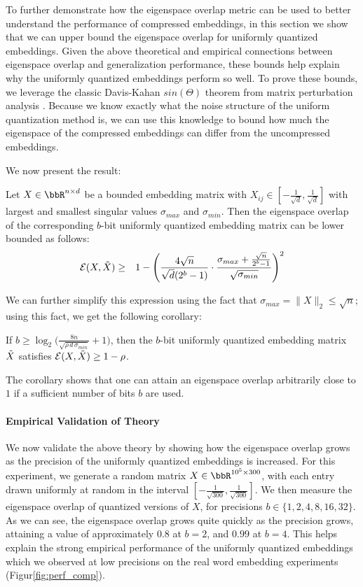 To further demonstrate how the eigenspace overlap metric can be used to better understand the performance of compressed embeddings, in this section we show that we can upper bound the eigenspace overlap for uniformly quantized embeddings.
Given the above theoretical and empirical connections between eigenspace overlap and generalization performance, these bounds help explain why the uniformly quantized embeddings perform so well.
To prove these bounds, we leverage the classic Davis-Kahan $sin(\Theta)$ theorem from matrix perturbation analysis \citep{sintheta70}.
Because we know exactly what the noise structure of the uniform quantization method is, we can use this knowledge to bound how much the eigenspace of the compressed embeddings can differ from the uncompressed embeddings.

We now present the result:
\begin{theorem}
	Let $X \in \RR^{n\times d}$ be a bounded embedding matrix with $X_{ij} \in [-\frac{1}{\sqrt{d}},\frac{1}{\sqrt{d}}]$ with largest and smallest singular values $\sigma_{max}$ and $\sigma_{min}$.
	Then the eigenspace overlap of the corresponding $b$-bit uniformly quantized embedding matrix can be lower bounded as follows:
	\begin{eqnarray*}
		\eigover(X,\tX) &\geq& 1 - \Bigg(\frac{4\sqrt{n}}{\sqrt{d}(2^b-1)} \cdot \frac{\sigma_{max} + \frac{\sqrt{n}}{2^b-1} }{\sqrt{\sigma_{min}}} \Bigg)^2
	\end{eqnarray*}
\label{thm1}
\end{theorem}
We can further simplify this expression using the fact that $\sigma_{max} = \|X\|_2 \leq \sqrt{n}$; using this fact, we get the following corollary:
\begin{corollary}
If $b \geq \log_2\bigg(\frac{8n}{\sqrt{\rho \, d\, \sigma_{min}}} + 1\bigg)$, then the $b$-bit uniformly quantized embedding matrix $\tX$ satisfies $\eigover(X,\tX) \geq 1-\rho$.
\end{corollary}

The corollary shows that one can attain an eigenspace overlap arbitrarily close to $1$ if a sufficient number of bits $b$ are used.

\paragraph{Empirical Validation of Theory}
We now validate the above theory by showing how the eigenspace overlap grows as the precision of the uniformly quantized embeddings is increased.
For this experiment, we generate a random matrix $X \in \RR^{10^5 \times 300}$, with each entry drawn uniformly at random in the interval $[-\frac{1}{\sqrt{300}}, \frac{1}{\sqrt{300}}]$.
We then measure the eigenspace overlap of quantized versions of $X$, for precisions $b \in \{1,2,4,8,16,32\}$.
As we can see, the eigenspace overlap grows quite quickly as the precision grows, attaining a value of approximately $0.8$ at $b=2$, and $0.99$ at $b=4$.
This helps explain the strong empirical performance of the uniformly quantized embeddings which we observed at low precisions on the real word embedding experiments (Figur\ref{fig:perf_comp}).

